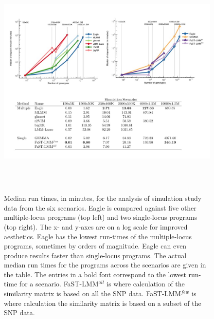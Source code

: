 \documentclass{article}
\begin{document}
  

 
\begin{figure}
\caption{Median run times, in minutes, for the analysis of simulation study data from the six scenarios. 
Eagle is compared against five other multiple-locus programs (top left) and two single-locus programs (top right). 
The x- and y-axes are on a log scale for improved aesthetics. Eagle has the lowest run-times of the multiple-locus 
programs, sometimes by orders of magnitude. Eagle can even produce results faster than single-locus programs. 
The actual median run times for the programs across the scenarios are given in the table. The entries in a bold font 
correspond to the lowest run-time for a scenario. 
 FaST-LMM$^{all}$ is where calculation of the similarity matrix is based on all the SNP data.  
 FaST-LMM$^{few}$ is where calculation  the similarity matrix is based on a subset of the SNP data. }

\label{fig_time}
\begin{center}
\includegraphics[width=14cm, height=12cm]{Figure2_time.jpg}
\end{center}

\end{figure}
\end{document}
